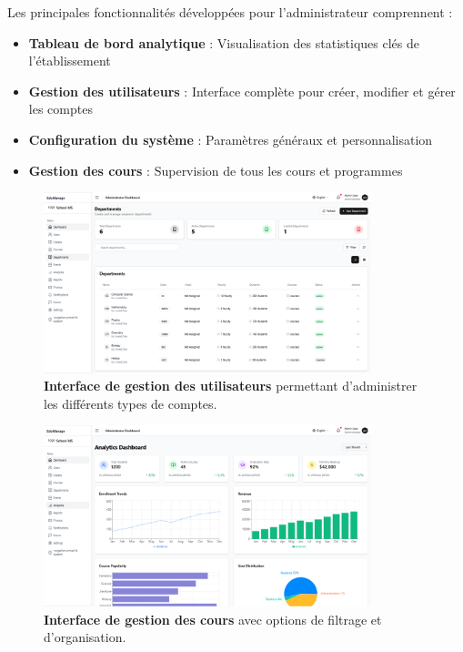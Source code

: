 Les principales fonctionnalités développées pour l'administrateur comprennent :

\begin{itemize}
  \item \textbf{Tableau de bord analytique} : Visualisation des statistiques clés de l'établissement
  
  \item \textbf{Gestion des utilisateurs} : Interface complète pour créer, modifier et gérer les comptes
  
  \item \textbf{Configuration du système} : Paramètres généraux et personnalisation
  
  \item \textbf{Gestion des cours} : Supervision de tous les cours et programmes
\end{itemize}

\begin{figure}[H]
  \centering
  \includegraphics[width=0.85\textwidth,keepaspectratio]{pfe-pics/admin/Screenshot 2025-06-09 at 22-39-15 Vite React TS.png}
  \caption{\textbf{Interface de gestion des utilisateurs} permettant d'administrer les différents types de comptes.}
  \label{fig:user_management}
\end{figure}

\begin{figure}[H]
  \centering
  \includegraphics[width=0.85\textwidth,keepaspectratio]{pfe-pics/admin/Screenshot 2025-06-09 at 22-40-11 Vite React TS.png}
  \caption{\textbf{Interface de gestion des cours} avec options de filtrage et d'organisation.}
  \label{fig:course_management_admin}
\end{figure}


